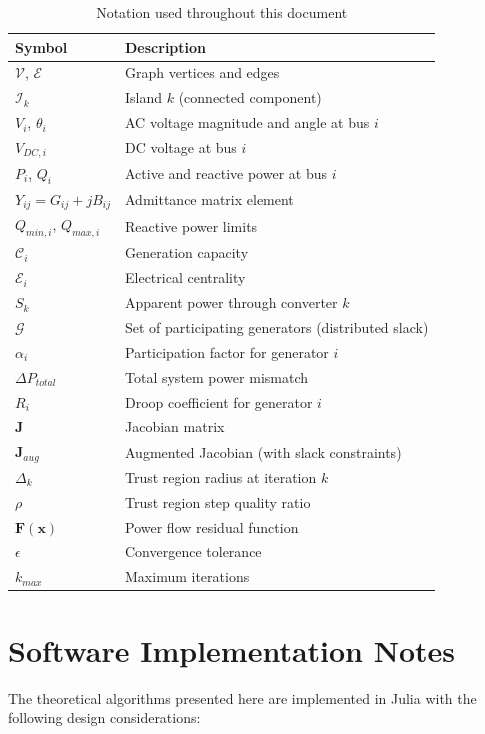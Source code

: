 \documentclass[11pt]{article}
\begin{document}
\begin{table}[h]
\centering
\begin{tabular}{ll}
\hline
Symbol & Description \\
\hline
$\mathcal{V}$, $\mathcal{E}$ & Graph vertices and edges \\
$\mathcal{I}_k$ & Island $k$ (connected component) \\
$V_i$, $\theta_i$ & AC voltage magnitude and angle at bus $i$ \\
$V_{DC,i}$ & DC voltage at bus $i$ \\
$P_i$, $Q_i$ & Active and reactive power at bus $i$ \\
$Y_{ij} = G_{ij} + jB_{ij}$ & Admittance matrix element \\
$Q_{min,i}$, $Q_{max,i}$ & Reactive power limits \\
$\mathcal{C}_i$ & Generation capacity \\
$\mathcal{E}_i$ & Electrical centrality \\
$S_k$ & Apparent power through converter $k$ \\
$\mathcal{G}$ & Set of participating generators (distributed slack) \\
$\alpha_i$ & Participation factor for generator $i$ \\
$\Delta P_{total}$ & Total system power mismatch \\
$R_i$ & Droop coefficient for generator $i$ \\
$\mathbf{J}$ & Jacobian matrix \\
$\mathbf{J}_{aug}$ & Augmented Jacobian (with slack constraints) \\
$\Delta_k$ & Trust region radius at iteration $k$ \\
$\rho$ & Trust region step quality ratio \\
$\mathbf{F}(\mathbf{x})$ & Power flow residual function \\
$\epsilon$ & Convergence tolerance \\
$k_{max}$ & Maximum iterations \\
\hline
\end{tabular}
\caption{Notation used throughout this document}
\end{table}

\section{Software Implementation Notes}

The theoretical algorithms presented here are implemented in Julia with the following design considerations:
\end{document}
